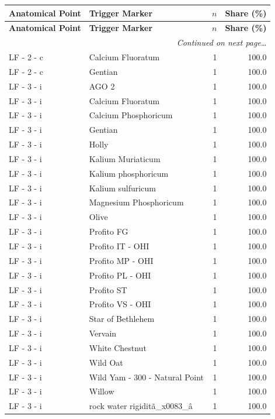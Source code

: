 \documentclass[a4paper,11pt]{article}
\begin{document}
\begin{footnotesize}
\begin{longtable}{p{3.5cm}p{7.5cm}rr}
\toprule
\textbf{Anatomical Point} &
\textbf{Trigger Marker} &
\textbf{$n$} &
\textbf{Share (\%)} \\
\midrule
\endfirsthead
\toprule
\textbf{Anatomical Point} &
\textbf{Trigger Marker} &
\textbf{$n$} &
\textbf{Share (\%)} \\
\midrule
\endhead
\midrule
\multicolumn{4}{r}{\footnotesize\emph{Continued on next page\ldots}} \\
\endfoot
\bottomrule
\endlastfoot
LF - 2 - c & Calcium Fluoratum & 1 & 100.0 \\
LF - 2 - c & Gentian & 1 & 100.0 \\
LF - 3 - i & AGO 2 & 1 & 100.0 \\
LF - 3 - i & Calcium Fluoratum & 1 & 100.0 \\
LF - 3 - i & Calcium Phosphoricum & 1 & 100.0 \\
LF - 3 - i & Gentian & 1 & 100.0 \\
LF - 3 - i & Holly & 1 & 100.0 \\
LF - 3 - i & Kalium Muriaticum & 1 & 100.0 \\
LF - 3 - i & Kalium phosphoricum & 1 & 100.0 \\
LF - 3 - i & Kalium sulfuricum & 1 & 100.0 \\
LF - 3 - i & Magnesium Phosphoricum & 1 & 100.0 \\
LF - 3 - i & Olive & 1 & 100.0 \\
LF - 3 - i & Profito FG & 1 & 100.0 \\
LF - 3 - i & Profito IT - OHI & 1 & 100.0 \\
LF - 3 - i & Profito MP - OHI & 1 & 100.0 \\
LF - 3 - i & Profito PL - OHI & 1 & 100.0 \\
LF - 3 - i & Profito ST & 1 & 100.0 \\
LF - 3 - i & Profito VS - OHI & 1 & 100.0 \\
LF - 3 - i & Star of Bethlehem & 1 & 100.0 \\
LF - 3 - i & Vervain & 1 & 100.0 \\
LF - 3 - i & White Chestnut & 1 & 100.0 \\
LF - 3 - i & Wild Oat & 1 & 100.0 \\
LF - 3 - i & Wild Yam - 300  - Natural Point & 1 & 100.0 \\
LF - 3 - i & Willow & 1 & 100.0 \\
LF - 3 - i & rock water rigiditã\_x0083\_â & 1 & 100.0 \\

\end{longtable}
\end{footnotesize}
\end{document}
